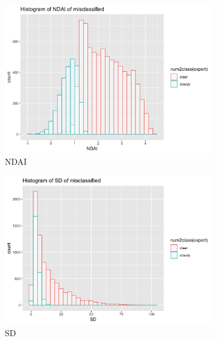 \documentclass[jou]{apa}%
\begin{document}
\begin{figure}[H]
\hspace*{-.5cm}\begin{subfigure}{0.4\columnwidth}
    \includegraphics[scale=.1]{NDAIsplit}
    \caption{NDAI}
    \label{fig:1}
  \end{subfigure}\hfill %
\begin{subfigure}{0.4\columnwidth} \hspace*{-1cm}
    \includegraphics[scale=.1]{SDsplit}
    \caption{SD}
    \label{fig:2}
  \end{subfigure}
\hspace*{-.5cm}\begin{subfigure}{0.4\columnwidth}

\end{subfigure}
\end{figure}
\end{document}

